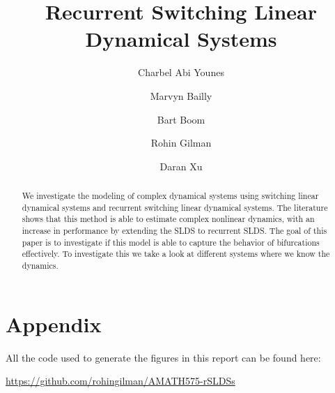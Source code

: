 \documentclass{amsart}
\title{Recurrent Switching Linear Dynamical Systems}
\author{Charbel Abi Younes \and Marvyn Bailly \and Bart Boom \and Rohin Gilman \and Daran Xu}
\date{}
\begin{document}
\begin{abstract}
	We investigate the modeling of complex dynamical systems using switching linear dynamical systems and recurrent switching linear dynamical systems. The literature shows that this method is able to estimate complex nonlinear dynamics, with an increase in performance by extending the SLDS to recurrent SLDS. The goal of this paper is to investigate if this model is able to capture the behavior of bifurcations effectively. To investigate this we take a look at different systems where we know the dynamics. 
\end{abstract}

\maketitle









\nocite{linderman_bayesian_2017, zoltowski_unifying_2020, chen_estimating_2015, blei_variational_2017, linderman_dependent_2015}



\pagebreak
\section{Appendix}

All the code used to generate the figures in this report can be found here: 

\href{https://github.com/rohingilman/AMATH575-rSLDSs}{https://github.com/rohingilman/AMATH575-rSLDSs}

\pagebreak


\end{document}
